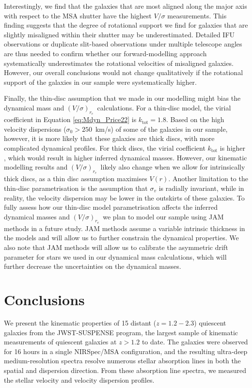 \documentclass{aa}
\newcommand{\vsigma}{$(V/\sigma)_{r_e}$}
\begin{document}
Interestingly, we find that the galaxies that are most aligned along the major axis with respect to the MSA shutter have the highest $V/\sigma$ measurements. This finding suggests that the degree of rotational support we find for galaxies that are slightly misaligned within their shutter may be underestimated. Detailed IFU observations or duplicate slit-based observations under multiple telescope angles are thus needed to confirm whether our forward-modelling approach systematically underestimates the rotational velocities of misaligned galaxies. However, our overall conclusions would not change qualitatively if the rotational support of the galaxies in our sample were systematically higher.

Finally, the thin-disc assumption that we made in our modelling might bias the dynamical mass and \vsigma\ calculations. For a thin-disc model, the virial coefficient in Equation \eqref{eq:Mdyn_Price22} is $k_{\text{tot}} = 1.8$. Based on the high velocity dispersions ($\sigma_0>250$~km/s) of some of the galaxies in our sample, however, it is more likely that these galaxies are thick discs, with more complicated dynamical profiles. For thick discs, the virial coefficient $k_{\text{tot}}$ is higher \citep{SPrice2022}, which would result in higher inferred dynamical masses. However, our kinematic modelling results and \vsigma\ likely also change when we allow for intrinsically thick discs, as a thin disc assumption maximises $V(r)$. Another limitation to the thin-disc parametrisation is the assumption that $\sigma_v$ is radially invariant, while in reality, the velocity dispersion may be lower in the outskirts of these galaxies. To fully assess how our thin-disc model parametrisation affects the inferred dynamical masses and \vsigma\, we plan to model our sample using JAM methods \citep{MCappellari2008} in a future study. JAM methods assume a variable intrinsic thickness in the models and will allow us to further constrain the dynamical properties. We also note that JAM methods will allow us to calibrate the asymmetric drift parameter for stars we used in our dynamical mass calculations, which will further decrease the uncertainties on the dynamical masses.

\section{Conclusions}\label{sec:summary}
We present the kinematic properties of 15 distant ($z=1.2-2.3$) quiescent galaxies from the JWST-SUSPENSE program, the largest sample of kinematic measurements of quiescent galaxies at $z>1.2$ to date. The galaxies were observed for 16 hours in a single NIRSpec/MSA configuration, and the resulting ultra-deep medium-resolution spectra resolve numerous stellar absorption lines in both the spatial and dispersion direction. From these absorption line spectra, we measured the stellar velocity and velocity dispersion profiles.
\end{document}
